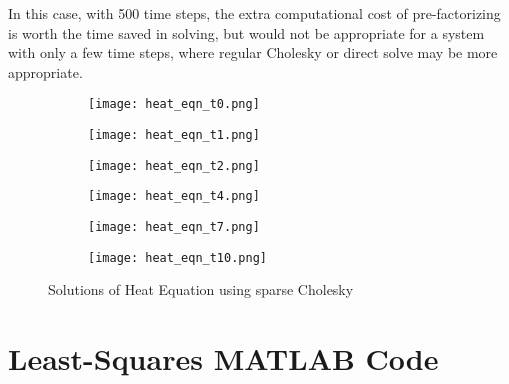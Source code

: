 \documentclass{template}
\begin{document}
In this case, with 500 time steps, the extra computational cost of pre-factorizing is worth the time saved in solving, but would not be appropriate for a system with only a few time steps, where regular Cholesky or direct solve may be more appropriate.


\begin{figure}[h]
    \centering
    \begin{subfigure}{0.48\textwidth}
        \texttt{[image: heat\_eqn\_t0.png]}
        \caption{}
        \label{}
    \end{subfigure}
    \begin{subfigure}{0.48\textwidth}
        \texttt{[image: heat\_eqn\_t1.png]}
        \caption{}
        \label{}
    \end{subfigure}

    \begin{subfigure}{0.48\textwidth}
        \texttt{[image: heat\_eqn\_t2.png]}
        \caption{}
        \label{}
    \end{subfigure}
    \begin{subfigure}{0.48\textwidth}
        \texttt{[image: heat\_eqn\_t4.png]}
        \caption{}
        \label{}
    \end{subfigure}

    \begin{subfigure}{0.48\textwidth}
        \texttt{[image: heat\_eqn\_t7.png]}
        \caption{}
        \label{}
    \end{subfigure}
    \begin{subfigure}{0.48\textwidth}
        \texttt{[image: heat\_eqn\_t10.png]}
        \caption{}
        \label{}
    \end{subfigure}
    \caption{Solutions of Heat Equation using sparse Cholesky}
    \label{fig:heat-eqn}
\end{figure}






\clearpage
\appendix
\section{Least-Squares MATLAB Code}\label{sec:lsqr}
\end{document}
